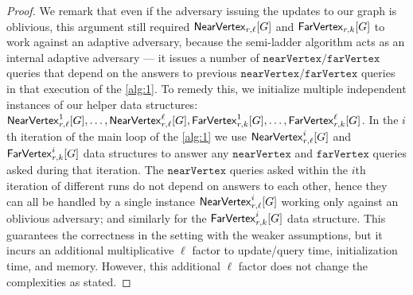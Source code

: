 \begin{proof}
	We remark that even if the adversary issuing the updates to our graph is oblivious, this argument still required $\nearVertexDS{G}{r,\ell}$ and $\farVertexDS{G}{r,k}$ to work against an adaptive adversary, because the semi-ladder algorithm acts as an internal adaptive adversary --- it issues a number of $\mathtt{nearVertex}/\mathtt{farVertex}$ queries that depend on the answers to previous $\mathtt{nearVertex}/\mathtt{farVertex}$ queries in that execution of the \cref{alg:1}. To remedy this, we initialize multiple independent instances of our helper data structures: $\nearVertexDSS{G}{r,\ell}{1}, \ldots, \nearVertexDSS{G}{r,\ell}{\ell}, \farVertexDSS{G}{r,k}{1}, \ldots, \farVertexDSS{G}{r,k}{\ell}$. In the $i$th iteration of the main loop of the \cref{alg:1} we use  $\nearVertexDSS{G}{r,\ell}{i}$ and $\farVertexDSS{G}{r,k}{i}$ data structures to answer any $\mathtt{nearVertex}$ and $\mathtt{farVertex}$ queries asked during that iteration. The $\mathtt{nearVertex}$ queries asked within the $i$th iteration of different runs do not depend on answers to each other, hence they can all be handled by a single instance $\nearVertexDSS{G}{r,\ell}{i}$ working only against an oblivious adversary; and similarly for the $\farVertexDSS{G}{r,k}{i}$ data structure. This guarantees the correctness in the setting with the weaker assumptions, but it incurs an additional multiplicative $\ell$ factor to update/query time, initialization time, and memory. However, this additional $\ell$ factor does not change the complexities as stated.
\end{proof}



